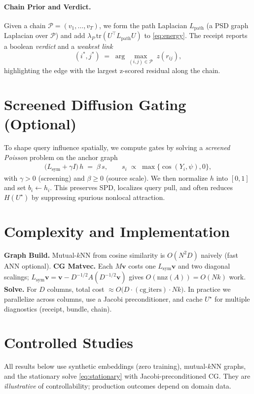 \documentclass[11pt]{article}
\begin{document}
\paragraph{Chain Prior and Verdict.}
Given a chain $\mathcal{P}=(v_1,\ldots,v_T)$, we form the path Laplacian $L_{\mathrm{path}}$ (a PSD graph Laplacian over $\mathcal{P}$) and add $\lambda_P\,\mathrm{tr}(U^\top L_{\mathrm{path}}U)$ to \eqref{eq:energy}. The receipt reports a boolean \emph{verdict} and a \emph{weakest link}
\[
(i^\ast,j^\ast) \;=\; \arg\max_{(i,j)\in \mathcal{P}} \; z(r_{ij}),
\]
highlighting the edge with the largest z-scored residual along the chain.

\vspace{-0.5em}
\section{Screened Diffusion Gating (Optional)}
To shape query influence spatially, we compute gates by solving a \emph{screened Poisson} problem on the anchor graph
\begin{align}
\label{eq:screened}
\Big(L_{\mathrm{sym}} + \gamma I\Big) \, h \;=\; \beta \, s,
\qquad s_i \;\propto\; \max\{\cos(Y_i,\psi),0\},
\end{align}
with $\gamma>0$ (screening) and $\beta\ge 0$ (source scale). We then normalize $h$ into $[0,1]$ and set $b_i \leftarrow h_i$. This preserves SPD, localizes query pull, and often reduces $H(U^\star)$ by suppressing spurious nonlocal attraction.

\vspace{-0.5em}
\section{Complexity and Implementation}
\textbf{Graph Build.} Mutual-$k$NN from cosine similarity is $O(N^2D)$ naively (fast ANN optional).
\textbf{CG Matvec.} Each $M\mathbf{v}$ costs one $L_{\mathrm{sym}}\mathbf{v}$ and two diagonal scalings; $L_{\mathrm{sym}}\mathbf{v}=\mathbf{v}-D^{-1/2}A(D^{-1/2}\mathbf{v})$ gives $O(\mathrm{nnz}(A))\!=O(Nk)$ work.
\textbf{Solve.} For $D$ columns, total cost $\approx O\big(D\cdot (\mathrm{cg\_iters})\cdot Nk\big)$. In practice we parallelize across columns, use a Jacobi preconditioner, and cache $U^\star$ for multiple diagnostics (receipt, bundle, chain).

\vspace{-0.5em}
\section{Controlled Studies}
All results below use synthetic embeddings (zero training), mutual-$k$NN graphs, and the stationary solve \eqref{eq:stationary} with Jacobi-preconditioned CG. They are \emph{illustrative} of controllability; production outcomes depend on domain data.
\end{document}
